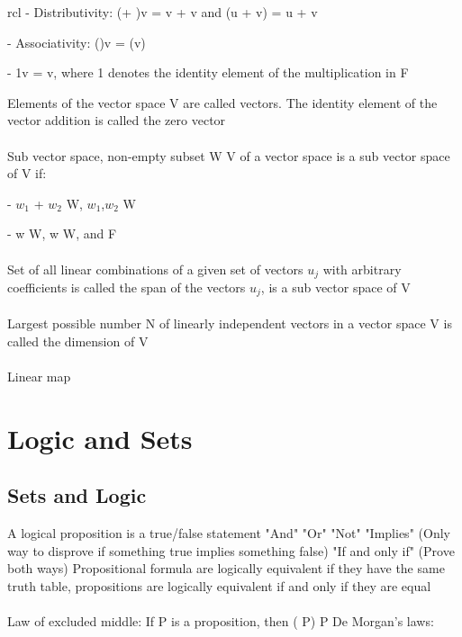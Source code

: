 \documentclass{article}
\begin{document}
\begin{arrary}{rcl}
- Distributivity: \math (\lambda + \mu)v = \lambda v + \mu v\) and \math \lambda (u + v) = \lambda u + \lambda v\)

- Associativity: (\lambda \mu)v = \lambda (\mu v)

- \math 1v = v\), where 1 denotes the identity element of the multiplication in F

Elements of the vector space V are called vectors. The identity element of the vector addition is called the zero vector
\\
\\
Sub vector space, non-empty subset W \subset\) V of a vector space is a sub vector space of V if:

- \math $w_1$ + $w_2$ \in W, \forall $w_1$,$w_2$ \in W\)

- \lambda w \in W, \forall w \in W\), and \lambda \in\) F
\\
\\
Set of all linear combinations of a given set of vectors {$u_j$} with arbitrary coefficients is called the span of the vectors {$u_j$}, is a sub vector space of V
\\
\\
Largest possible number N of linearly independent vectors in a vector space V is called the dimension of V
\\
\\
Linear map

\section{Logic and Sets}

\subsection{Sets and Logic}

A logical proposition is a true/false statement
\newline "And" \wedge\)
\newline "Or" \vee\)
\newline "Not" \neg\)
\newline "Implies" \Rightarrow\) (Only way to disprove if something true implies something false)
\newline "If and only if" \Leftrightarrow\) (Prove both ways)
\newline Propositional formula are logically equivalent if they have the same truth table, propositions are logically equivalent if and only if they are equal
\\
\\
Law of excluded middle: If P is a proposition, then \neg\) (\neg\) P) \Leftrightarrow\) P
\newline De Morgan's laws:


\end{arrary}
\end{document}
